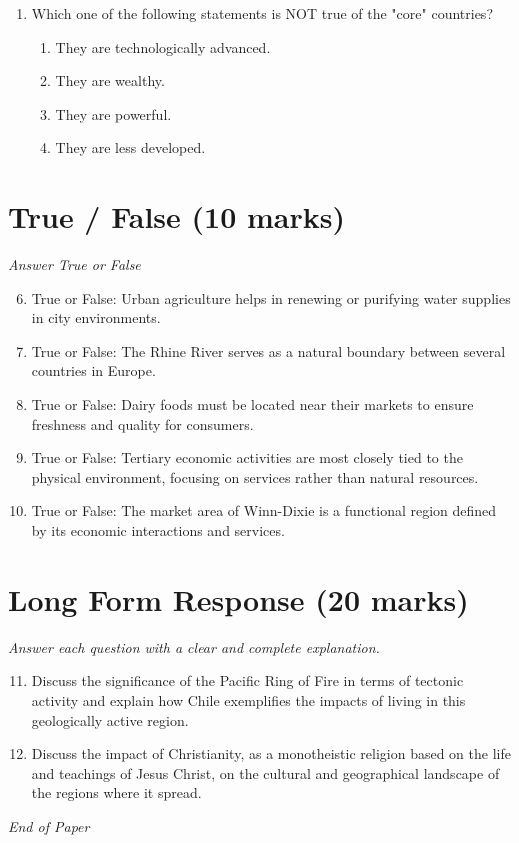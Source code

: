 \documentclass[12pt]{article}
\begin{document}
\begin{enumerate}[label=\arabic*.]
\begin{enumerate}[label=(\alph*)]
    \item It greatly improved crop yields in sub-Saharan Africa.
\end{enumerate}
\item Which one of the following statements is NOT true of the "core" countries?
\begin{enumerate}[label=(\alph*)]
    \item They are technologically advanced.
    \item They are wealthy.
    \item They are powerful.
    \item They are less developed.
\end{enumerate}
\end{enumerate}

\section*{True / False (10 marks)}
\textit{Answer True or False}
\begin{enumerate}[label=\arabic*.]
\setcounter{enumi}{5}
\item True or False: Urban agriculture helps in renewing or purifying water supplies in city environments.
\item True or False: The Rhine River serves as a natural boundary between several countries in Europe.
\item True or False: Dairy foods must be located near their markets to ensure freshness and quality for consumers.
\item True or False: Tertiary economic activities are most closely tied to the physical environment, focusing on services rather than natural resources.
\item True or False: The market area of Winn-Dixie is a functional region defined by its economic interactions and services.
\end{enumerate}

\section*{Long Form Response (20 marks)}
\textit{Answer each question with a clear and complete explanation.}
\begin{enumerate}[label=\arabic*.]
\setcounter{enumi}{10}
\item Discuss the significance of the Pacific Ring of Fire in terms of tectonic activity and explain how Chile exemplifies the impacts of living in this geologically active region.
\item Discuss the impact of Christianity, as a monotheistic religion based on the life and teachings of Jesus Christ, on the cultural and geographical landscape of the regions where it spread.
\end{enumerate}

\vfill
\noindent\textit{End of Paper}
\end{document}
